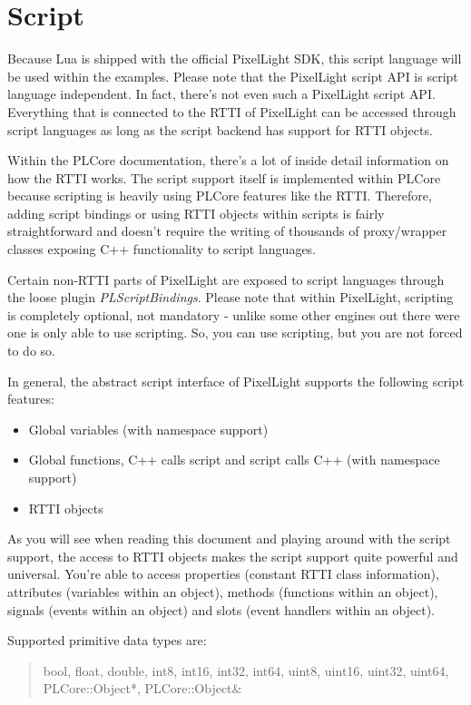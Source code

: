 \chapter{Script}
Because Lua is shipped with the official PixelLight \ac{SDK}, this script language will be used within the examples. Please note that the PixelLight script \ac{API} is script language independent. In fact, there's not even such a PixelLight script \ac{API}. Everything that is connected to the \ac{RTTI} of PixelLight can be accessed through script languages as long as the script backend has support for \ac{RTTI} objects.

Within the PLCore documentation, there's a lot of inside detail information on how the \ac{RTTI} works. The script support itself is implemented within PLCore because scripting is heavily using PLCore features like the \ac{RTTI}. Therefore, adding script bindings or using \ac{RTTI} objects within scripts is fairly straightforward and doesn't require the writing of thousands of proxy/wrapper classes exposing C++ functionality to script languages.

Certain non-\ac{RTTI} parts of PixelLight are exposed to script languages through the loose plugin \emph{PLScriptBindings}. Please note that within PixelLight, scripting is completely optional, not mandatory - unlike some other engines out there were one is only able to use scripting. So, you can use scripting, but you are not forced to do so.

In general, the abstract script interface of PixelLight supports the following script features:
\begin{itemize}
\item{Global variables (with namespace support)}
\item{Global functions, C++ calls script and script calls C++ (with namespace support)}
\item{\ac{RTTI} objects}
\end{itemize}

As you will see when reading this document and playing around with the script support, the access to \ac{RTTI} objects makes the script support quite powerful and universal. You're able to access properties (constant \ac{RTTI} class information), attributes (variables within an object), methods (functions within an object), signals (events within an object) and slots (event handlers within an object).

Supported primitive data types are: \begin{quote}bool, float, double, int8, int16, int32, int64, uint8, uint16, uint32, uint64, PLCore::Object*, PLCore::Object\&\end{quote}

